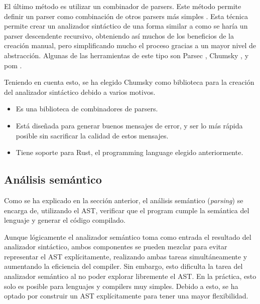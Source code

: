 El último método es utilizar un combinador de \glspl{parser}. Este método
permite definir un \gls{parser} como combinación de otros \glspl{parser} más
simples \parencite{parser-combinators}. Esta técnica permite crear un analizador
sintáctico de una forma similar a como se haría un \gls{parser} descendente
recursivo, obteniendo así muchos de los beneficios de la creación manual, pero
simplificando mucho el proceso gracias a un mayor nivel de abstracción. Algunas
de las herramientas de este tipo son Parsec \parencite{parsec}, Chumsky
\parencite{chumsky}, y pom \parencite{pom}.

Teniendo en cuenta esto, se ha elegido Chumsky como biblioteca para la creación
del analizador sintáctico debido a varios motivos.

\begin{itemize}
    \item Es una biblioteca de combinadores de \glspl{parser}.
    \item Está diseñada para generar buenos mensajes de error, y ser lo más
    rápida posible sin sacrificar la calidad de estos mensajes.
    \item Tiene soporte para Rust, el \gls{programming language} elegido
    anteriormente.
\end{itemize}

\subsection{Análisis semántico}\label{subsec:compiler}

Como se ha explicado en la sección anterior, el análisis semántico
(\textit{parsing}) se encarga de, utilizando el \gls{AST}, verificar que el
\gls{program} cumple la semántica del lenguaje y generar el código compilado.

Aunque lógicamente el analizador semántico toma como entrada el resultado del
analizador sintáctico, ambos componentes se pueden mezclar para evitar
representar el \gls{AST} explícitamente, realizando ambas tareas simultáneamente
y aumentando la eficiencia del \gls{compiler}. Sin embargo, esto dificulta la
tarea del analizador semántico al no poder explorar libremente el \gls{AST}. En
la práctica, esto solo es posible para lenguajes y \glspl{compiler} muy simples.
Debido a esto, se ha optado por construir un \gls{AST} explícitamente para tener
una mayor flexibilidad. \parencite{compiler-design}

